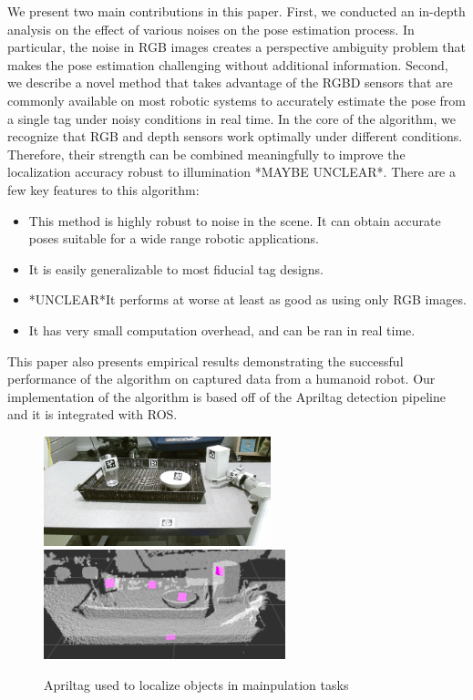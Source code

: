 We present two main contributions in this paper. First, we conducted an in-depth analysis on the effect of various noises on the pose estimation process. In particular, the noise in RGB images creates a perspective ambiguity problem that makes the pose estimation challenging without additional information. Second, we describe a novel method that takes advantage of the RGBD sensors that are commonly available on most robotic systems to accurately estimate the pose from a single tag under noisy conditions in real time. In the core of the algorithm, we recognize that RGB and depth sensors work optimally under different conditions. Therefore, their strength can be combined meaningfully to improve the localization accuracy robust to illumination *MAYBE UNCLEAR*. There are a few key features to this algorithm: 
\begin{itemize}
\item This method is highly robust to noise in the scene. It can obtain accurate poses suitable for a wide range robotic applications.   
\item It is easily generalizable to most fiducial tag designs.
\item *UNCLEAR*It performs at worse at least as good as using only RGB images.
\item It has very small computation overhead, and can be ran in real time. 
\end{itemize}

This paper also presents empirical results demonstrating the successful performance of the algorithm on captured data from a humanoid robot. Our implementation of the algorithm is based off of the Apriltag detection pipeline and it is integrated with ROS. 

\begin{figure}
\includegraphics[width=\columnwidth, height=120px]{figs/table_clearing_rgb_small} \\
\includegraphics[width=\columnwidth, height=120px]{figs/table_clearing_depth}
\label{fig:table_clearing}
\caption{Apriltag used to localize objects in mainpulation tasks}
\end{figure}